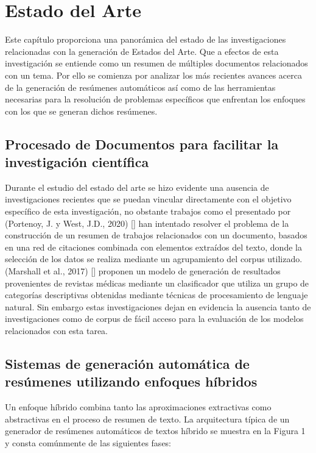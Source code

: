 \chapter{Estado del Arte}\label{chapter:state-of-the-art}
    Este capítulo proporciona una panorámica del estado de las investigaciones relacionadas con la generación de Estados del Arte. Que a efectos de esta investigación se entiende como un resumen de múltiples documentos relacionados con un tema. Por ello se comienza por analizar los más recientes avances acerca de la generación de resúmenes automáticos así como de las herramientas necesarias para la resolución de problemas específicos que enfrentan los enfoques con los que se generan dichos resúmenes.

\section{Procesado de Documentos para facilitar la investigación científica}
Durante el estudio del estado del arte se hizo evidente una ausencia de investigaciones recientes que se puedan vincular directamente con el objetivo específico de esta investigación, no obstante trabajos como el presentado por (Portenoy, J. y West, J.D., 2020) [\cite{portenoy2020constructing}] han intentado resolver el problema de la construcción de un resumen de trabajos relacionados con un documento, basados en una red de citaciones combinada con elementos extraídos del texto, donde la selección de los datos se realiza mediante un agrupamiento del corpus utilizado. (Marshall et al., 2017) [\cite{marshall}] 
proponen un modelo de generación de resultados provenientes de revistas médicas mediante un clasificador que utiliza un grupo de categorías descriptivas obtenidas mediante técnicas de procesamiento de lenguaje natural. Sin embargo estas investigaciones dejan en evidencia la ausencia tanto de investigaciones como de corpus de fácil acceso para la evaluación de los modelos relacionados con esta tarea.

\section{Sistemas de generación automática de resúmenes utilizando enfoques híbridos}

Un enfoque híbrido combina tanto las aproximaciones extractivas como abstractivas en el proceso de resumen de texto. La arquitectura típica  de un generador de resúmenes automáticos de textos híbrido se muestra en la Figura 1 y consta comúnmente de las siguientes fases:

